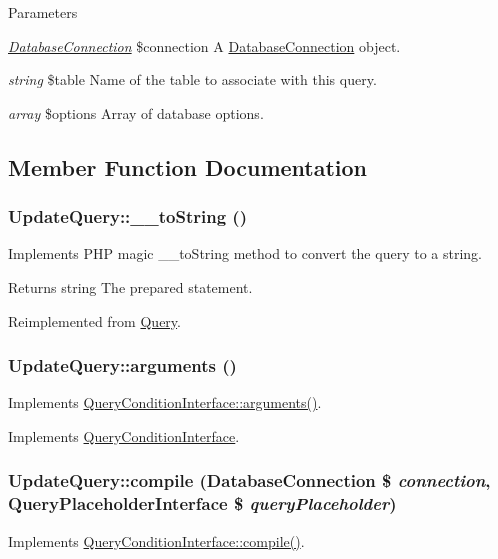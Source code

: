 \begin{DoxyParams}{Parameters}
\item[{\em \hyperlink{classDatabaseConnection}{DatabaseConnection}}]\$connection A \hyperlink{classDatabaseConnection}{DatabaseConnection} object. \item[{\em string}]\$table Name of the table to associate with this query. \item[{\em array}]\$options Array of database options. \end{DoxyParams}


\subsection{Member Function Documentation}
\hypertarget{classUpdateQuery_ac85d757de811a3563119e453e8b356a0}{
\subsubsection[{\_\-\_\-toString}]{\setlength{\rightskip}{0pt plus 5cm}UpdateQuery::\_\-\_\-toString ()}}
\label{classUpdateQuery_ac85d757de811a3563119e453e8b356a0}
Implements PHP magic \_\-\_\-toString method to convert the query to a string.

\begin{DoxyReturn}{Returns}
string The prepared statement. 
\end{DoxyReturn}


Reimplemented from \hyperlink{classQuery_a16c3a3265666b784d49ce18a6fda9a8a}{Query}.\hypertarget{classUpdateQuery_a2c4a12ea4382257466781f78aa813d06}{
\subsubsection[{arguments}]{\setlength{\rightskip}{0pt plus 5cm}UpdateQuery::arguments ()}}
\label{classUpdateQuery_a2c4a12ea4382257466781f78aa813d06}
Implements \hyperlink{interfaceQueryConditionInterface_ac2349e02d5332412182cf472ba1a1b1e}{QueryConditionInterface::arguments()}. 

Implements \hyperlink{interfaceQueryConditionInterface_ac2349e02d5332412182cf472ba1a1b1e}{QueryConditionInterface}.\hypertarget{classUpdateQuery_aea38d2404c542788180cd7fc8867f39d}{
\subsubsection[{compile}]{\setlength{\rightskip}{0pt plus 5cm}UpdateQuery::compile ({\bf DatabaseConnection} \$ {\em connection}, \/  {\bf QueryPlaceholderInterface} \$ {\em queryPlaceholder})}}
\label{classUpdateQuery_aea38d2404c542788180cd7fc8867f39d}
Implements \hyperlink{interfaceQueryConditionInterface_ad409672ac9ac50787eec52ecdf5a60b1}{QueryConditionInterface::compile()}. 

